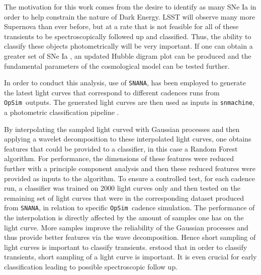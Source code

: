 \documentclass[a4paper,10pt]{article}
\newcommand{\opsim}{{\tt OpSim\ }}
\newcommand{\sne}{{SNe Ia }}
\begin{document}
The motivation for this work comes from the desire to identify as many \sne in
order to help constrain the nature of Dark Energy.
LSST will observe many more Supernova than ever before, but at a rate that is
not feasible for all of these transients to be spectroscopically followed up and
classified. Thus, the ability to classify these objects photometrically will be very
important. If one can obtain a greater set of \sne, an updated Hubble
digram plot can be produced and the fundamental parameters of the cosmological
model can be tested further.

In order to conduct this analysis, use of
{\tt SNANA}\cite{kessler2009snana}, has been employed to generate the latest light curves that
correspond to different cadences runs from \opsim outputs. The generated light
curves are then used as inputs in {\tt snmachine}, a photometric
classification pipeline \cite{lochner2016photometric}.

By interpolating the sampled light curved with Gaussian processes and then
applying a wavelet decomposition to these interpolated light curves, one obtains features
that could be provided to a classifier, in this case a Random Forest algorithm.
For performance, the dimensions of these features were reduced further with a principle
component analysis and then these reduced features were provided as inputs to the algorithm.
To ensure a controlled test,
for each cadence run, a classifier was trained on 2000 light
curves only and then tested on the remaining set of light curves that were in the
corresponding dataset produced from {\tt SNANA}, in relation to specific
\opsim cadence simulation.
The performance of the interpolation is directly affected by the amount of
samples one has on the light curve. More samples improve the reliability of the Gaussian processes and thus provide better features via the wave
decomposition. Hence short sampling of light curves is important to classify transients. erstood that in order to classify transients, short
sampling of a light curve is important. It is even crucial for early classification leading to possible spectroscopic follow up.
\end{document}
